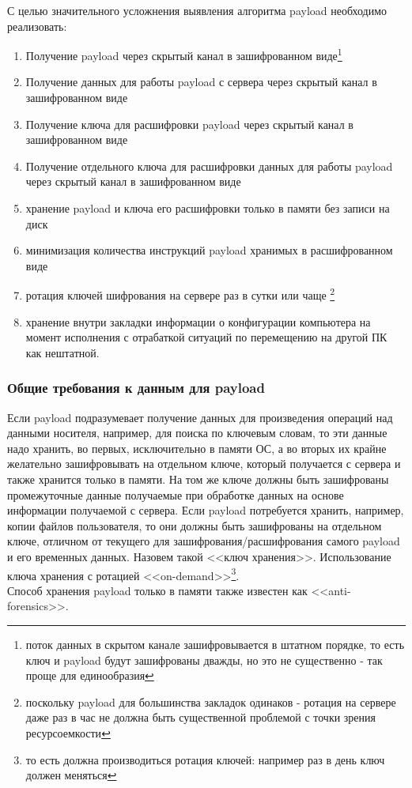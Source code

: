 С целью значительного усложнения  выявления алгоритма payload
необходимо реализовать:

\begin{enumerate}
\item{Получение payload через скрытый канал в зашифрованном виде\footnote{поток данных в скрытом канале
зашифровывается в штатном порядке, то есть ключ и payload будут зашифрованы дважды, но это не
существенно - так проще для единообразия}}
\item{Получение данных для работы payload с сервера через скрытый канал в зашифрованном виде}
\item{Получение ключа для расшифровки payload через скрытый канал в зашифрованном виде}
\item{Получение отдельного ключа для расшифровки данных для работы payload через скрытый
канал в зашифрованном виде}
\item{хранение payload и ключа его расшифровки только в памяти без записи на диск}
\item{минимизация количества инструкций payload хранимых в расшифрованном виде}
\item{ротация ключей шифрования на сервере раз в сутки или чаще
 \footnote {
 поскольку payload для большинства закладок одинаков - ротация на
 сервере даже раз в час не должна быть существенной проблемой с точки
 зрения ресурсоемкости
  }
}
\item{хранение внутри закладки информации о конфигурации компьютера на момент исполнения с отрабаткой
ситуаций по перемещению на другой ПК как нештатной.}
\end{enumerate}


\subsubsection{Общие требования к данным для payload}
\label{in_mem_only_payload}
Если payload подразумевает получение данных для произведения операций
над данными носителя, например, для поиска по ключевым словам, то  эти
данные надо хранить, во первых, исключительно в памяти ОС, а во вторых
их крайне желательно зашифровывать на отдельном ключе, который
получается  с сервера и также хранится только в памяти. На том же ключе
должны быть  зашифрованы промежуточные данные получаемые при обработке
данных на основе информации получаемой с сервера. Если payload
потребуется хранить, например, копии файлов пользователя, то они должны
быть зашифрованы на отдельном ключе, отличном от текущего для
зашифрования/расшифрования самого payload и его  временных данных.
Назовем такой <<ключ хранения>>. Использование ключа хранения с ротацией
<<on-demand>>\footnote{то есть должна производиться ротация ключей:
например раз в день ключ должен меняться}.\\
Способ хранения payload только в памяти также известен как <<anti-forensics>>.

